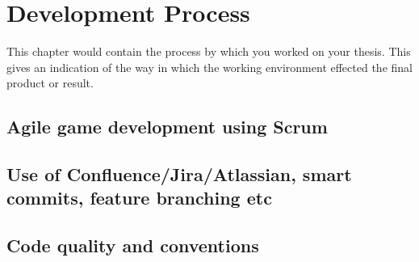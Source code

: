 \chapter{Development Process}
\label{chap:process}

This chapter would contain the process by which you worked on your thesis.  This gives an indication of the way in which the working environment effected the final product or result.

\section{Agile game development using Scrum}
\section{Use of Confluence/Jira/Atlassian, smart commits, feature branching etc}
\section{Code quality and conventions}







